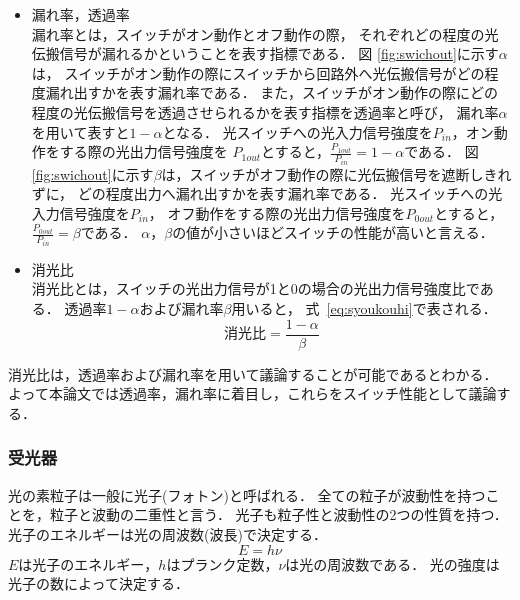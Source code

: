 \begin{itemize}
\item 漏れ率，透過率\\
漏れ率とは，スイッチがオン動作とオフ動作の際，
それぞれどの程度の光伝搬信号が漏れるかということを表す指標である．
図 \ref{fig:swichout}に示す$\alpha $は，
スイッチがオン動作の際にスイッチから回路外へ光伝搬信号がどの程度漏れ出すかを表す漏れ率である．
また，スイッチがオン動作の際にどの程度の光伝搬信号を透過させられるかを表す指標を透過率と呼び，
漏れ率$\alpha$を用いて表すと$1- \alpha$となる．
光スイッチへの光入力信号強度を$P_{in}$，オン動作をする際の光出力信号強度を
$P_{1out}$とすると，$\frac{P_{1out}}{P_{in}}=1- \alpha$である．
図 \ref{fig:swichout}に示す$\beta $は，スイッチがオフ動作の際に光伝搬信号を遮断しきれずに，
どの程度出力へ漏れ出すかを表す漏れ率である．
光スイッチへの光入力信号強度を$P_{in}$，
オフ動作をする際の光出力信号強度を$P_{0out}$とすると，
$\frac{P_{0out}}{P_{in}}=\beta$である．
$\alpha $，$ \beta $の値が小さいほどスイッチの性能が高いと言える．
\item 消光比\\
消光比とは，スイッチの光出力信号が1と0の場合の光出力信号強度比である．
透過率$1- \alpha$および漏れ率$\beta $用いると，
式~\eqref{eq:syoukouhi}で表される．
\begin{equation}
消光比= \frac{1- \alpha}{\beta}
\label{eq:syoukouhi}
\end{equation}
\end{itemize}

消光比は，透過率および漏れ率を用いて議論することが可能であるとわかる．
よって本論文では透過率，漏れ率に着目し，これらをスイッチ性能として議論する．

\subsubsection{受光器}
光の素粒子は一般に光子(フォトン)と呼ばれる．
全ての粒子が波動性を持つことを，粒子と波動の二重性と言う．
光子も粒子性と波動性の2つの性質を持つ\cite{大津}．
光子のエネルギーは光の周波数(波長)で決定する．
\begin{equation}
E = h \nu \label{eq:hikarienergy}
\end{equation}
$Eは光子のエネルギー，hはプランク定数，\nu$は光の周波数である．
光の強度は光子の数によって決定する．

